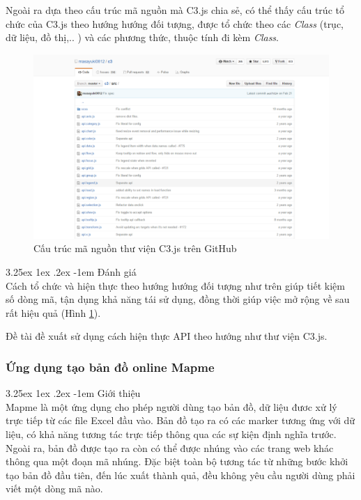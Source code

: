 \documentclass[12pt,a4paper]{article}
\makeatletter
\newcommand{\myparagraph}[1]{\paragraph{#1}\mbox{}\\} %
\renewcommand\paragraph{\@startsection{paragraph}{5}{\z@}%
  {3.25ex \@plus1ex \@minus.2ex}%
  {-1em}%
  {\normalfont\normalsize\bfseries}}
\makeatother
\begin{document}
Ngoài ra dựa theo cấu trúc mã nguồn mà C3.js chia sẻ, có thể thấy cấu trúc tổ chức của C3.js theo hướng hướng đối tượng, được tổ chức theo các \textit{Class} (trục, dữ liệu, đồ thị,.. ) và các phương thức, thuộc tính đi kèm \textit{Class}.

\begin{figure}[!h]
	\begin{center}
    \includegraphics[scale=.4]{image/c3source}
    \caption{Cấu trúc mã nguồn thư viện C3.js trên GitHub}
    \label{fig:c3source}
	\end{center}
\end{figure}

\myparagraph{Đánh giá}
Cách tổ chức và hiện thực theo hướng hướng đối tượng như trên giúp tiết kiệm số dòng mã, tận dụng khả năng tái sử dụng, đồng thời giúp việc mở rộng về sau rất hiệu quả (Hình \ref{fig:c3source}).

Đề tài đề xuất sử dụng cách hiện thực API theo hướng như thư viện C3.js.

\subsubsection{Ứng dụng tạo bản đồ online Mapme}
\myparagraph{Giới thiệu}
Mapme\cite{mapme} là một ứng dụng cho phép người dùng tạo bản đồ, dữ liệu đươc xử lý trực tiếp từ các file Excel đầu vào. Bản đồ tạo ra có các marker tương ứng với dữ liệu, có khả năng tương tác trực tiếp thông qua các sự kiện định nghĩa trước. Ngoài ra, bản đồ được tạo ra còn có thể được nhúng vào các trang web khác thông qua một đoạn mã nhúng. Đặc biệt toàn bộ tương tác từ những bước khởi tạo bản đồ đầu tiên, đến lúc xuất thành quả, đều không yêu cầu người dùng phải viết một dòng mã nào.
\end{document}
